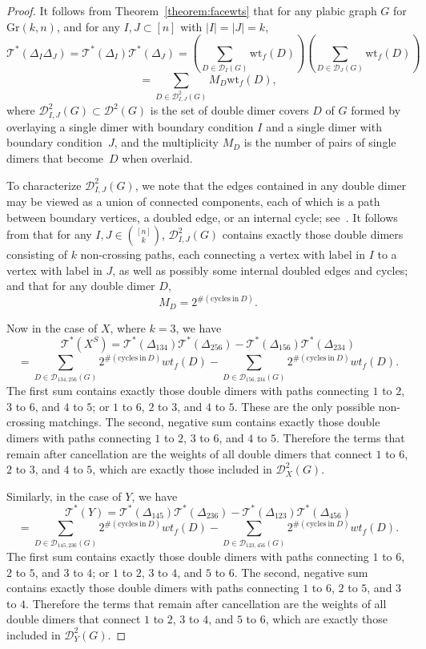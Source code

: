 \documentclass[11pt]{article}
\theoremstyle{definition}
\numberwithin{equation}{section}
\def\T {{\mathscr{T}^*}}
\def\Gr {{\textrm{Gr}}}
\numberwithin{equation}{section}
\begin{document}
\begin{proof}
It follows from Theorem~\ref{theorem:facewts} that for any plabic graph $G$ for $\Gr(k,n)$, and for any $I,J \subset [n]$ with $|I|=|J|=k$,
\[\T(\Delta_I\Delta_J) =\T(\Delta_I)\T(\Delta_J)= \left(\sum_{D \in \mathcal{D}_I(G)} \text{wt}_f(D)\right)\left(\sum_{D \in \mathcal{D}_J(G)} \text{wt}_f(D)\right)\]
\[=\sum_{D \in \mathcal{D}_{I,J}^2(G)}M_D \text{wt}_f(D),\]
where $\mathcal{D}_{I,J}^2(G) \subset \mathcal{D}^2(G)$ is the set of double dimer covers $D$ of $G$ formed by overlaying a single dimer with boundary condition $I$ and a single dimer with boundary condition~$J$, and the multiplicity $M_D$ is the number of pairs of single dimers that become~$D$ when overlaid.

To characterize $\mathcal{D}_{I,J}^2(G)$, we note that the edges contained in any double dimer may be viewed as a union of connected components, each of which is a path between boundary vertices, a doubled edge, or an internal cycle; see~\cite{kuo04}. It follows from \cite[Theorem 3.1]{lam2015} that for any $I,J \in \binom{[n]}{k}$, $\mathcal{D}_{I,J}^2(G)$ contains exactly those double dimers consisting of $k$ non-crossing paths, each connecting a vertex with label in $I$ to a vertex with label in $J$, as well as possibly some internal doubled edges and cycles; and that for any double dimer $D$,
\[M_D=2^{\# (\mathrm{cycles~in~}D)}.\]

Now in the case of $X$, where $k=3$, we have
\[\mathscr{T}^*(X^S)=\mathscr{T}^*(\Delta_{134})\mathscr{T}^*(\Delta_{256})-\mathscr{T}^*(\Delta_{156})\mathscr{T}^*(\Delta_{234})\]
\[=\sum_{D \in \mathcal{D}_{134,256}(G)} 2^{\#( \mathrm{cycles~in~}D)}wt_f(D) - \sum_{D \in \mathcal{D}_{156,234}(G)} 2^{\# (\mathrm{cycles~in~}D)}wt_f(D).\]
The first sum contains exactly those double dimers with paths connecting $1$ to $2$, $3$ to $6$, and $4$ to $5$; or $1$ to $6$, $2$ to $3$, and $4$ to $5$. These are the only possible non-crossing matchings. The second, negative sum contains exactly those double dimers with paths connecting $1$ to $2$, $3$ to $6$, and $4$ to $5$. Therefore the terms that remain after cancellation are the weights of all double dimers that connect $1$ to $6$, $2$ to $3$, and $4$ to $5$, which are exactly those included in $\mathcal{D}_{X}^2(G)$.

Similarly, in the case of $Y$, we have
\[\mathscr{T}^*(Y)=\mathscr{T}^*(\Delta_{145})\mathscr{T}^*(\Delta_{236})-\mathscr{T}^*(\Delta_{123})\mathscr{T}^*(\Delta_{456})\]
\[=\sum_{D \in \mathcal{D}_{145,236}(G)} 2^{\#( \mathrm{cycles~in~}D)}wt_f(D) - \sum_{D \in \mathcal{D}_{123,456}(G)} 2^{\# (\mathrm{cycles~in~}D)}wt_f(D).\]
The first sum contains exactly those double dimers with paths connecting $1$ to $6$, $2$ to $5$, and $3$ to $4$; or $1$ to $2$, $3$ to $4$, and $5$ to $6$. The second, negative sum contains exactly those double dimers with paths connecting $1$ to $6$, $2$ to $5$, and $3$ to $4$. Therefore the terms that remain after cancellation are the weights of all double dimers that connect $1$ to $2$, $3$ to $4$, and $5$ to $6$, which are exactly those included in $\mathcal{D}_{Y}^2(G)$.


\end{proof}
\end{document}
